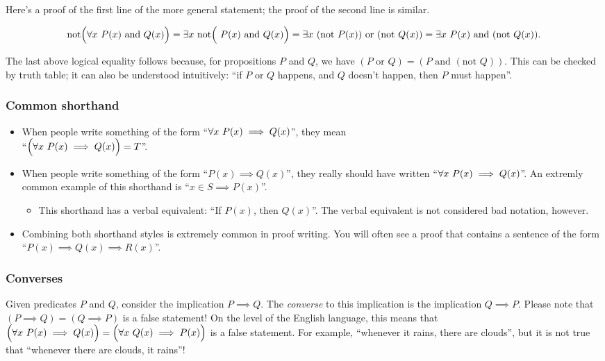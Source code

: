 Here's a proof of the first line of the more general statement; the proof of the second line is similar.

\begin{align*}
    \text{not}\Big( \forall x \text{ } P(x) \text{ and } Q(x) \Big)
    =
    \exists x \text{ } \text{not}\Big( \text{ } P(x) \text{ and } Q(x) \Big)
    =
    \exists x \text{ } (\text{not } P(x)) \text{ or } (\text{not } Q(x))
    =
    \exists x \text{ } P(x) \text{ and } (\text{not } Q(x)).
\end{align*}

The last above logical equality follows because, for propositions $P$ and $Q$, we have $(P \text{ or } Q) = (P \text{ and } (\text{not } Q))$. This can be checked by truth table; it can also be understood intuitively: ``if $P$ or $Q$ happens, and $Q$ doesn't happen, then $P$ must happen''.

\subsubsection{Common shorthand}

\begin{itemize}
    \item When people write something of the form ``$\forall x \text{ } P(x) \implies Q(x)$'', they mean \\ ``$\Big(\forall x \text{ } P(x) \implies Q(x)\Big) = T$''. 
    \item When people write something of the form ``$P(x) \implies Q(x)$'', they really should have written ``$\forall x \text{ } P(x) \implies Q(x)$''. An extremly common example of this shorthand is ``$x \in S \implies P(x)$''.
    \begin{itemize}
        \item This shorthand has a verbal equivalent: ``If $P(x)$, then $Q(x)$''. The verbal equivalent is not considered bad notation, however.
    \end{itemize}
    \item Combining both shorthand styles is extremely common in proof writing. You will often see a proof that contains a sentence of the form ``$P(x) \implies Q(x) \implies R(x)$''.
\end{itemize}

\subsubsection{Converses}

Given predicates $P$ and $Q$, consider the implication $P \implies Q$. The \textit{converse} to this implication is the implication $Q \implies P$. Please note that $(P \implies Q) = (Q \implies P)$ is a false statement! On the level of the English language, this means that $\Big( \forall x \text{ } P(x) \implies Q(x) \Big) = \Big( \forall x \text{ } Q(x) \implies P(x) \Big)$ is a false statement. For example, ``whenever it rains, there are clouds'', but it is not true that ``whenever there are clouds, it rains''!

